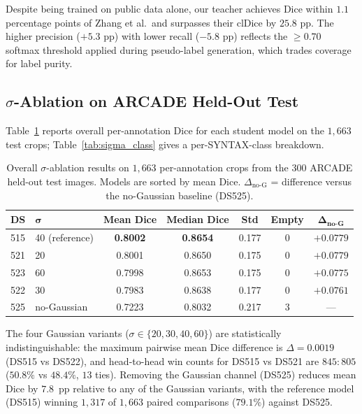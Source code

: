 \documentclass[12pt]{article}
\begin{document}
Despite being trained on public data alone, our teacher achieves Dice within
$1.1$ percentage points of Zhang et al.\ and surpasses their clDice by $25.8$ pp.
The higher precision ($+5.3$ pp) with lower recall ($-5.8$ pp) reflects the
$\geq0.70$ softmax threshold applied during pseudo-label generation, which
trades coverage for label purity.

\subsection{$\sigma$-Ablation on ARCADE Held-Out Test}

Table~\ref{tab:sigma_overall} reports overall per-annotation Dice for each
student model on the $1{,}663$ test crops; Table~\ref{tab:sigma_class} gives a
per-SYNTAX-class breakdown.

\begin{table}[!htb]
\centering
\caption{Overall $\sigma$-ablation results on $1{,}663$ per-annotation crops
from the 300 ARCADE held-out test images. Models are sorted by mean Dice.
$\Delta_{\text{no-G}}$ = difference versus the no-Gaussian baseline (DS525).}
\label{tab:sigma_overall}
\begin{tabular}{llccccc}
\toprule
\textbf{DS} & $\boldsymbol{\sigma}$ & \textbf{Mean Dice} & \textbf{Median Dice} & \textbf{Std} & \textbf{Empty} & $\boldsymbol{\Delta_{\text{no-G}}}$ \\
\midrule
515 & 40 (reference) & \textbf{0.8002} & \textbf{0.8654} & 0.177 & 0 & $+0.0779$ \\
521 & 20             & 0.8001          & 0.8650           & 0.175 & 0 & $+0.0779$ \\
523 & 60             & 0.7998          & 0.8653           & 0.175 & 0 & $+0.0775$ \\
522 & 30             & 0.7983          & 0.8638           & 0.177 & 0 & $+0.0761$ \\
\midrule
525 & no-Gaussian    & 0.7223          & 0.8032           & 0.217 & 3 & --- \\
\bottomrule
\end{tabular}
\end{table}

The four Gaussian variants ($\sigma \in \{20, 30, 40, 60\}$) are
statistically indistinguishable: the maximum pairwise mean Dice difference
is $\Delta{=}0.0019$ (DS515 vs DS522), and head-to-head win counts for
DS515 vs DS521 are $845{:}805$ ($50.8\%$ vs $48.4\%$, $13$ ties).
Removing the Gaussian channel (DS525) reduces mean Dice by $7.8$~pp
relative to any of the Gaussian variants, with the reference model (DS515)
winning $1{,}317$ of $1{,}663$ paired comparisons ($79.1\%$) against DS525.
\end{document}
